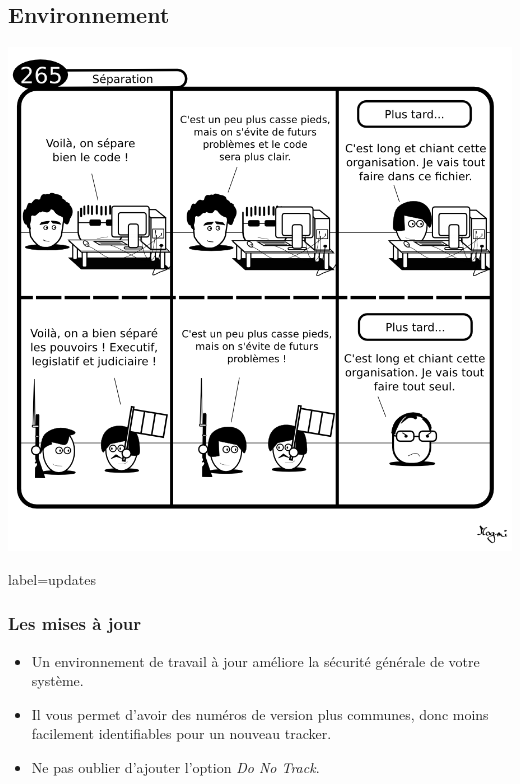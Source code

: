 \documentclass{beamer}
\begin{document}
        \subsection{Environnement}
            \begin{frame}
                \begin{center}
                    \includegraphics[scale=0.35]{img/265-separation.png}
                \end{center}
            \end{frame}
            \begin{frame}{label=updates}
                \frametitle{Les mises à jour}
                \begin{center}
                    \begin{itemize}
                        \item Un environnement de travail à jour améliore la sécurité générale de votre système.
                        \item Il vous permet d'avoir des numéros de version plus communes, donc moins facilement identifiables pour un nouveau tracker.
                        \item Ne pas oublier d'ajouter l'option \textit{Do No Track}.
                    \end{itemize}
                \end{center}
            \end{frame}
\end{document}

